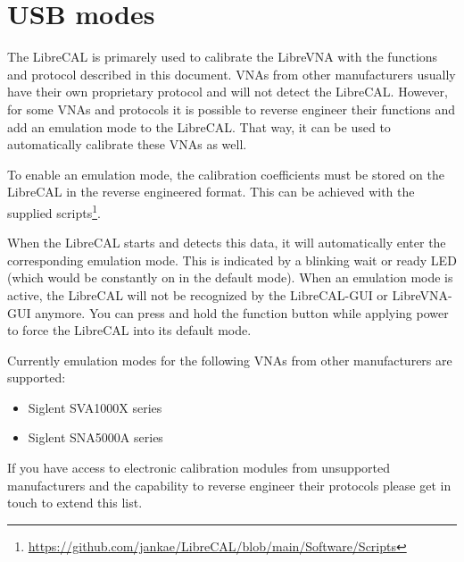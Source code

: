 \documentclass[a4paper,11pt]{article}
\newcommand{\dev}{LibreCAL}
\begin{document}
\section{USB modes}
The \dev{} is primarely used to calibrate the LibreVNA with the functions and protocol described in this document. VNAs from other manufacturers usually have their own proprietary protocol and will not detect the \dev{}. However, for some VNAs and protocols it is possible to reverse engineer their functions and add an emulation mode to the \dev{}. That way, it can be used to automatically calibrate these VNAs as well.

To enable an emulation mode, the calibration coefficients must be stored on the LibreCAL in the reverse engineered format. This can be achieved with the supplied scripts\footnote{\url{https://github.com/jankae/LibreCAL/blob/main/Software/Scripts}}.

When the \dev{} starts and detects this data, it will automatically enter the corresponding emulation mode. This is indicated by a blinking wait or ready LED (which would be constantly on in the default mode). When an emulation mode is active, the \dev{} will not be recognized by the \dev{}-GUI or LibreVNA-GUI anymore. You can press and hold the function button while applying power to force the \dev{} into its default mode.

Currently emulation modes for the following VNAs from other manufacturers are supported:
\begin{itemize}
\item Siglent SVA1000X series
\item Siglent SNA5000A series
\end{itemize}
If you have access to electronic calibration modules from unsupported manufacturers and the capability to reverse engineer their protocols please get in touch to extend this list.
\end{document}
